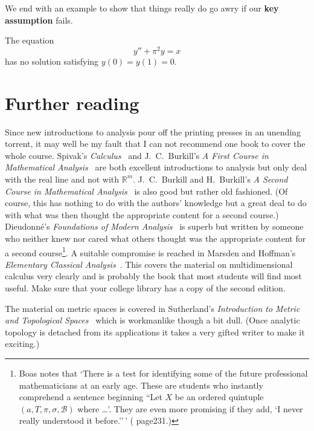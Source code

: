 We end with an example to show that things really
do go awry if our {\bf key assumption} fails.
\begin{example} The equation
\[y''+\pi^{2}y=x\]
has no solution satisfying $y(0)=y(1)=0$.
\end{example}
\section{Further reading} Since new introductions to
analysis pour off the printing presses in an unending
torrent, it may well be my fault that I can not
recommend one book to cover the whole course. 
Spivak's \emph{Calculus}~\cite{Spivak} and
J.~C.~Burkill's
\emph{A First Course in Mathematical Analysis}~\cite{Burkill 1}
are both excellent introductions to analysis
but only deal with the real line and not with ${\mathbb R}^{m}$.
J.~C.~Burkill and H.~Burkill's
\emph{A Second Course in Mathematical Analysis}~\cite{Burkill 2}
is also good but rather old fashioned. (Of course, this
has nothing to do with the authors' knowledge but a great
deal to do with what was then thought the appropriate
content for a second course.) Dieudonn\'{e}'s
\emph{Foundations of Modern Analysis}~\cite{Dieudonn}
is superb
but written by someone who neither knew nor cared
what others thought was the appropriate
content for a second course\footnote{Boas notes that
`There
is a test for identifying some of the future professional
mathematicians at an early age. These are students
who instantly comprehend a sentence beginning
``Let $X$ be an ordered quintuple 
$(a,T,\pi,\sigma,{\mathcal B})$ where \dots'. They are 
even more promising if they add, `I never really understood
it before.''\,' (\cite{Boas} page231.)}. 
A  suitable compromise is reached in Marsden and Hoffman's
\emph{Elementary Classical Analysis}~\cite{Marsden}.
This covers the material on multidimensional calculus
very clearly and is probably the book that most students
will find most useful. Make sure that your college
library has a copy of the second edition.

The material on metric spaces is covered
in Sutherland's \emph{Introduction to Metric and Topological
Spaces}~\cite{Sutherland} which is workmanlike though
a bit dull. (Once analytic topology is detached from its 
applications it takes a very gifted writer to 
make it exciting.)

